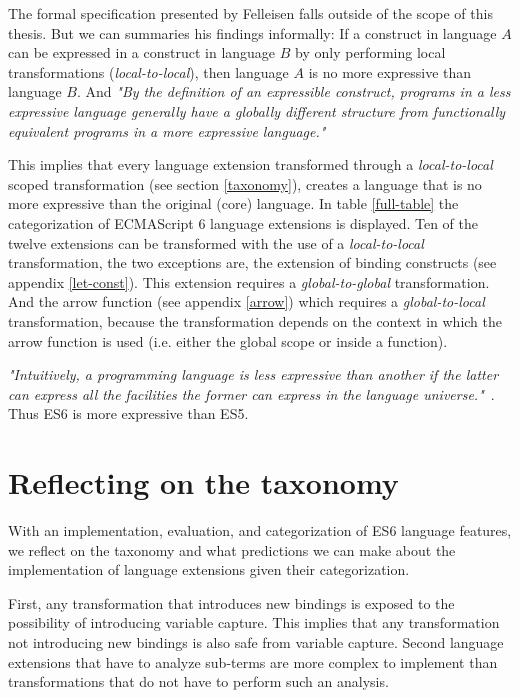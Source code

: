The formal specification presented by Felleisen falls outside of the scope of this thesis. But we can summaries his findings informally: If a construct in language $A$ can be expressed in a construct in language $B$ by only performing local transformations (\textit{local-to-local}), then language $A$ is no more expressive than language $B$. And \textit{"By the definition of an expressible construct, programs in a less expressive language generally have a globally different structure from functionally equivalent programs in a more expressive language."}\cite{Felleisen1990}

This implies that every language extension transformed through a \textit{local-to-local} scoped transformation (see section \ref{taxonomy}), creates a language that is no more expressive than the original (core) language. In table \ref{full-table} the categorization of ECMAScript 6 language extensions is displayed. Ten of the twelve extensions can be transformed with the use of a \textit{local-to-local} transformation, the two exceptions are, the extension of binding constructs (see appendix \ref{let-const}). This extension requires a \textit{global-to-global} transformation. And the arrow function (see appendix \ref{arrow}) which requires a \textit{global-to-local} transformation, because the transformation depends on the context in which the arrow function is used (i.e. either the global scope or inside a function).

\textit{"Intuitively, a programming language is less expressive than another if the latter can express all the facilities the former can express in the language universe."}~\cite{Felleisen1990}. Thus ES6 is more expressive than ES5.

\section{Reflecting on the taxonomy}
With an implementation, evaluation, and categorization of ES6 language features, we reflect on the taxonomy and what predictions we can make about the implementation of language extensions given their categorization.

First, any transformation that introduces new bindings is exposed to the possibility of introducing variable capture. This implies that any transformation not introducing new bindings is also safe from variable capture. Second language extensions that have to analyze sub-terms are more complex to implement than transformations that do not have to perform such an analysis. 

